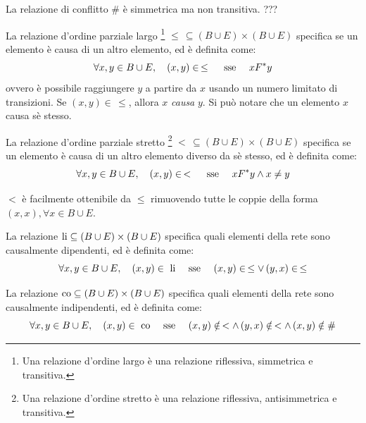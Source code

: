 \begin{rem}
    La relazione di conflitto $\#$ è simmetrica ma non transitiva. ???
\end{rem}

\begin{defn}
    La relazione d'ordine parziale largo \footnote{Una relazione d'ordine largo è una relazione riflessiva, simmetrica e transitiva.} $\le \, \subseteq (B \cup E) \times (B \cup E)$ specifica se un elemento è causa di un altro elemento, ed è definita come:
    \[
        \forall x, y \in B \cup E, \quad (x, y) \in \, \le \quad \textnormal{ sse } \quad x F^*y
    \]
    ovvero è possibile raggiungere $y$ a partire da $x$ usando un numero limitato di transizioni. Se $(x,y) \in \, \le$, allora $x$ \textit{causa} $y$.
    Si può notare che un elemento $x$ causa sè stesso.
\end{defn}

\begin{defn}
    La relazione d'ordine parziale stretto \footnote{Una relazione d'ordine stretto è una relazione riflessiva, antisimmetrica e transitiva.} $< \, \subseteq (B \cup E) \times (B \cup E)$ specifica se un elemento è causa di un altro elemento diverso da sè stesso, ed è definita come:
    \[
        \forall x, y \in B \cup E, \quad (x, y) \in \, < \quad \textnormal{ sse } \quad x F^*y \land x \neq y
    \]
\end{defn}

\begin{rem}
    $<$ è facilmente ottenibile da $\le$ rimuovendo tutte le coppie della forma $(x,x), \forall x \in B \cup E$.
\end{rem}

\begin{defn}
    La relazione $\textnormal{li} \subseteq (B \cup E) \times (B \cup E)$ specifica quali elementi della rete sono causalmente dipendenti, ed è definita come: 
    \[
        \forall x, y \in B \cup E, \quad (x, y) \in \textnormal{ li} \quad \textnormal{ sse } \quad (x,y) \in \, \le \lor \, (y,x) \in \, \le
    \]
\end{defn}

\begin{defn}
    La relazione $\textnormal{co} \subseteq (B \cup E) \times (B \cup E)$ specifica quali elementi della rete sono causalmente indipendenti, ed è definita come: 
    \[
        \forall x, y \in B \cup E, \quad (x, y) \in \textnormal{ co} \quad \textnormal{ sse } \quad (x,y) \notin \, < \land \, (y,x) \notin \, < \land \, (x,y) \notin \#
    \]
\end{defn}

